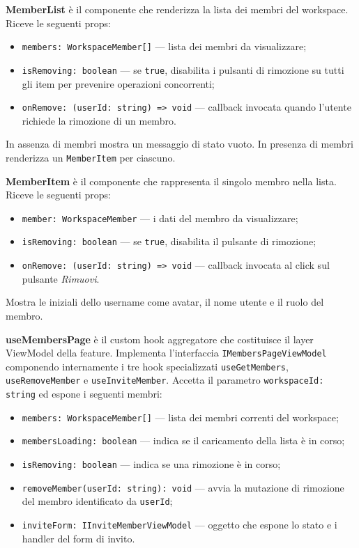 \documentclass[a4paper, 11pt]{article}
\newcounter{subsubsubsection}[subsubsection]
\newcounter{subsubsubsubsection}[subsubsubsection]
\begin{document}
\textbf{MemberList} è il componente che renderizza la lista dei membri del workspace. Riceve
le seguenti props:
\begin{itemize}
  \item \texttt{members: WorkspaceMember[]} — lista dei membri da visualizzare;
  \item \texttt{isRemoving: boolean} — se \texttt{true}, disabilita i pulsanti di rimozione su
        tutti gli item per prevenire operazioni concorrenti;
  \item \texttt{onRemove: (userId: string) => void} — callback invocata quando l'utente richiede
        la rimozione di un membro.
\end{itemize}
In assenza di membri mostra un messaggio di stato vuoto. In presenza di membri renderizza un
\texttt{MemberItem} per ciascuno.

\textbf{MemberItem} è il componente che rappresenta il singolo membro nella lista. Riceve le
seguenti props:
\begin{itemize}
  \item \texttt{member: WorkspaceMember} — i dati del membro da visualizzare;
  \item \texttt{isRemoving: boolean} — se \texttt{true}, disabilita il pulsante di rimozione;
  \item \texttt{onRemove: (userId: string) => void} — callback invocata al click sul pulsante
        \textit{Rimuovi}.
\end{itemize}
Mostra le iniziali dello username come avatar, il nome utente e il ruolo del membro.


\textbf{useMembersPage} è il custom hook aggregatore che costituisce il layer ViewModel della
feature. Implementa l'interfaccia \texttt{IMembersPageViewModel} componendo internamente i tre
hook specializzati \texttt{useGetMembers}, \texttt{useRemoveMember} e \texttt{useInviteMember}.
Accetta il parametro \texttt{workspaceId: string} ed espone i seguenti membri:
\begin{itemize}
  \item \texttt{members: WorkspaceMember[]} — lista dei membri correnti del workspace;
  \item \texttt{membersLoading: boolean} — indica se il caricamento della lista è in corso;
  \item \texttt{isRemoving: boolean} — indica se una rimozione è in corso;
  \item \texttt{removeMember(userId: string): void} — avvia la mutazione di rimozione del membro
        identificato da \texttt{userId};
  \item \texttt{inviteForm: IInviteMemberViewModel} — oggetto che espone lo stato e i handler
        del form di invito.
\end{itemize}
\end{document}
